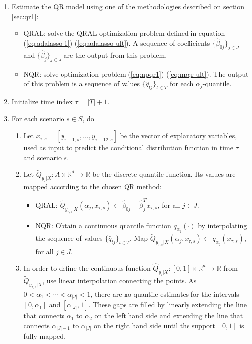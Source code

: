 \begin{enumerate}
	
	\item Estimate the QR model using one of the methodologies described on section \ref{sec:qr1}:  
	\begin{itemize}
		\item QRAL: solve the QRAL optimization problem defined in equation (\ref{eq:adalasso-1})-(\ref{eq:adalasso-ult}). 
		A sequence of coefficients $\{ \hat\beta_{0j} \}_{j \in J}$ and $\{ \hat\beta_{j} \}_{j \in J}$ are the output from this problem. 
		\item NQR: solve optimization problem (\ref{eq:npqr1})-(\ref{eq:npqr-ult}). The output of this problem is a sequence of values $\{ \hat q_{tj} \}_{t \in T}$ for each $\alpha_j$-quantile. 
	\end{itemize}

	\item Initialize time index $\tau = |T| + 1$.
	
	\item For each scenario $s \in S$, do
		\begin{enumerate}

		\item Let $x_{\tau,s} = [y_{\tau-1,s}, \dots, y_{\tau-12,s}]$ be the vector of explanatory variables, used as input to predict the conditional distribution function in time $\tau$ and scenario $s$.

		\item Let $\tilde{Q}_{y_\tau|X}:A \times \mathbb{R}^d \rightarrow \mathbb{R}$ be the discrete quantile function. Its values are mapped according to the chosen QR method:
		\begin{itemize}
			\item QRAL: $\tilde Q_{y_{\tau,s}|X}(\alpha_j, x_{\tau,s}) \leftarrow \hat\beta_{0j} + \hat\beta_j^T x_{\tau,s}$, for all $j \in J$.
			
			\item NQR: Obtain a continuous quantile function $\bar q_{\alpha_j}(\cdot)$ by interpolating the sequence of values $\{\hat q_{tj}\}_{t \in T}$. 
			Map $\tilde Q_{y_{\tau,s}|X}(\alpha_j, x_{\tau,s}) \leftarrow \bar q_{\alpha_j}( x_{\tau,s})$, for all $j \in J$.

			\end{itemize}

			\item In order to define the continuous function $\hat{Q}_{y_\tau|X}:[0,1] \times \mathbb{R}^d \rightarrow \mathbb{R}$ from $\tilde Q_{y_{\tau,s}|X}$, use linear interpolation connecting the points. As $0 < \alpha_1 < \cdots < \alpha_{|J|} < 1$, there are no quantile estimates for the intervals $[0,\alpha_1]$ and $[\alpha_{|J|},1]$. These gaps are filled by linearly extending the line that connects $\alpha_1$ to $\alpha_2$ on the left hand side and extending the line that connects $\alpha_{|J|-1}$ to $\alpha_{|J|}$ on the right hand side until the support $[0,1]$ is fully mapped.  


\end{enumerate}
\end{enumerate}
